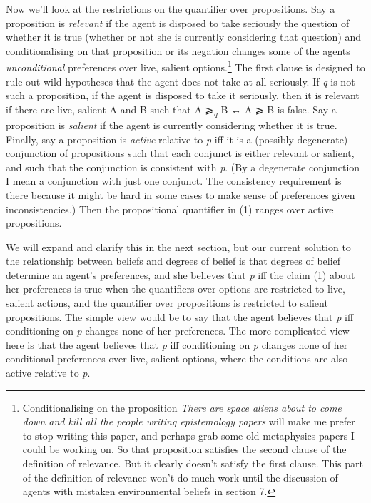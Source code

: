 \documentclass[
  10pt,
  letterpaper,
  DIV=11,
  numbers=noendperiod,
  twoside]{scrartcl}
\begin{document}
Now we'll look at the restrictions on the quantifier over propositions.
Say a proposition is \emph{relevant} if the agent is disposed to take
seriously the question of whether it is true (whether or not she is
currently considering that question) and conditionalising on that
proposition or its negation changes some of the agents
\emph{unconditional} preferences over live, salient options.\footnote{Conditionalising
  on the proposition \emph{There are space aliens about to come down and
  kill all the people writing epistemology papers} will make me prefer
  to stop writing this paper, and perhaps grab some old metaphysics
  papers I could be working on. So that proposition satisfies the second
  clause of the definition of relevance. But it clearly doesn't satisfy
  the first clause. This part of the definition of relevance won't do
  much work until the discussion of agents with mistaken environmental
  beliefs in section 7.} The first clause is designed to rule out wild
hypotheses that the agent does not take at all seriously. If \emph{q} is
not such a proposition, if the agent is disposed to take it seriously,
then it is relevant if there are live, salient A and B such that A
⩾\textsubscript{\emph{q}} B ↔︎ A ⩾ B is false. Say a proposition is
\emph{salient} if the agent is currently considering whether it is true.
Finally, say a proposition is \emph{active} relative to \emph{p} iff it
is a (possibly degenerate) conjunction of propositions such that each
conjunct is either relevant or salient, and such that the conjunction is
consistent with \emph{p}. (By a degenerate conjunction I mean a
conjunction with just one conjunct. The consistency requirement is there
because it might be hard in some cases to make sense of preferences
given inconsistencies.) Then the propositional quantifier in (1) ranges
over active propositions.

We will expand and clarify this in the next section, but our current
solution to the relationship between beliefs and degrees of belief is
that degrees of belief determine an agent's preferences, and she
believes that \emph{p} iff the claim (1) about her preferences is true
when the quantifiers over options are restricted to live, salient
actions, and the quantifier over propositions is restricted to salient
propositions. The simple view would be to say that the agent believes
that \emph{p} iff conditioning on \emph{p} changes none of her
preferences. The more complicated view here is that the agent believes
that \emph{p} iff conditioning on \emph{p} changes none of her
conditional preferences over live, salient options, where the conditions
are also active relative to \emph{p}.
\end{document}
